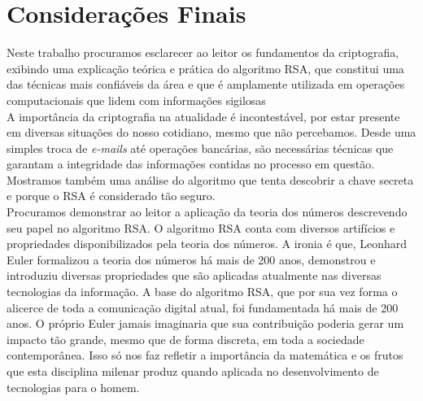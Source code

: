 \chapter[Considerações Finais]{Considerações Finais}
\label{chap:consideracoes}
	Neste trabalho procuramos esclarecer ao leitor os fundamentos da criptografia, exibindo uma explicação teórica e prática do algoritmo RSA, que constitui uma das técnicas mais confiáveis da área e que é amplamente utilizada em operações computacionais que lidem com informações sigilosas 
	\\ \indent A importância da criptografia na atualidade é incontestável, por estar presente em diversas situações do nosso cotidiano, mesmo que não percebamos. Desde uma simples troca de \emph{e-mails} até operações bancárias, são necessárias técnicas que garantam a integridade das informações contidas no processo em questão. Mostramos também uma análise do algoritmo que tenta descobrir a chave secreta e porque o RSA é considerado tão seguro.
	\\ \indent Procuramos demonstrar ao leitor a aplicação da teoria dos números descrevendo seu papel no algoritmo RSA. O algoritmo RSA conta com diversos artifícios e propriedades disponibilizados pela teoria dos números. A ironia é que, Leonhard Euler formalizou a teoria dos números há mais de 200 anos, demonstrou e introduziu diversas propriedades que são aplicadas atualmente nas diversas tecnologias da informação. A base do algoritmo RSA, que por sua vez forma o alicerce de toda a comunicação digital atual, foi fundamentada há mais de 200 anos. O próprio Euler jamais imaginaria que sua contribuição poderia gerar um impacto tão grande, mesmo que de forma discreta, em toda a sociedade contemporânea. Isso só nos faz refletir a importância da matemática e os frutos que esta disciplina milenar produz quando aplicada no desenvolvimento de tecnologias para o homem.
